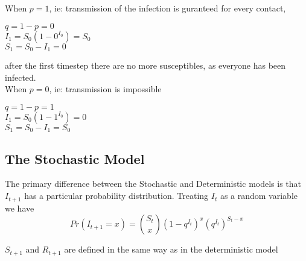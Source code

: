 \documentclass[12pt, letterpaper]{article}
\begin{document}
When $p = 1$, ie: transmission of the infection is guranteed for every contact,
\\
\begin{center}
$q = 1 - p = 0$ \\
$I_{1} = S_0(1 - 0^{I_0}) = S_0$ \\
$S_{1} = S_0 - I_1 = 0$
\end{center}

after the first timestep there are no more susceptibles, as everyone has been infected.
\\

When $p = 0$, ie: transmission is impossible
\\
\begin{center}
$q = 1 - p = 1$ \\
$I_{1} = S_0(1 - 1^{I_0}) = 0$ \\
$S_{1} = S_0 - I_1 = S_0$
\end{center}

\subsection*{The Stochastic Model}
The primary difference between the Stochastic and Deterministic models is that $I_{t+1}$ has a particular probability distribution.
Treating $I_t$ as a random variable we have \\

\begin{equation}
    Pr(I_{t+1} = x) = {S_t \choose x} (1-q^{I_t})^x(q^{I_t})^{S_t - x} 
\end{equation}

$S_{t+1}$ and $R_{t+1}$ are defined in the same way as in the deterministic model
\end{document}
